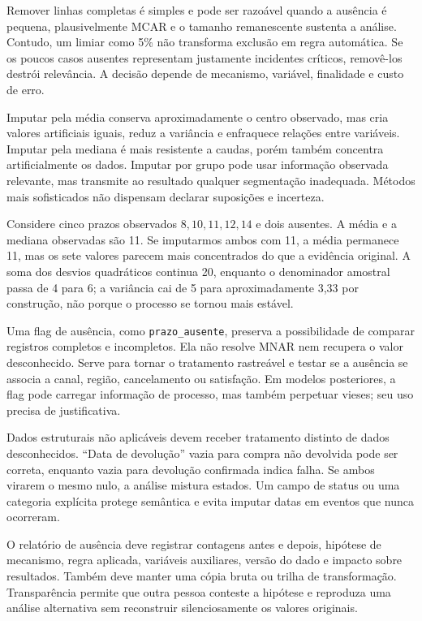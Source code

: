 Remover linhas completas é simples e pode ser razoável quando a ausência é pequena, plausivelmente MCAR e o tamanho remanescente sustenta a análise. Contudo, um limiar como 5\% não transforma exclusão em regra automática. Se os poucos casos ausentes representam justamente incidentes críticos, removê-los destrói relevância. A decisão depende de mecanismo, variável, finalidade e custo de erro.

Imputar pela média conserva aproximadamente o centro observado, mas cria valores artificiais iguais, reduz a variância e enfraquece relações entre variáveis. Imputar pela mediana é mais resistente a caudas, porém também concentra artificialmente os dados. Imputar por grupo pode usar informação observada relevante, mas transmite ao resultado qualquer segmentação inadequada. Métodos mais sofisticados não dispensam declarar suposições e incerteza.

Considere cinco prazos observados $8,10,11,12,14$ e dois ausentes. A média e a mediana observadas são 11. Se imputarmos ambos com 11, a média permanece 11, mas os sete valores parecem mais concentrados do que a evidência original. A soma dos desvios quadráticos continua 20, enquanto o denominador amostral passa de 4 para 6; a variância cai de 5 para aproximadamente 3,33 por construção, não porque o processo se tornou mais estável.

Uma flag de ausência, como \texttt{prazo\_ausente}, preserva a possibilidade de comparar registros completos e incompletos. Ela não resolve MNAR nem recupera o valor desconhecido. Serve para tornar o tratamento rastreável e testar se a ausência se associa a canal, região, cancelamento ou satisfação. Em modelos posteriores, a flag pode carregar informação de processo, mas também perpetuar vieses; seu uso precisa de justificativa.

Dados estruturais não aplicáveis devem receber tratamento distinto de dados desconhecidos. ``Data de devolução'' vazia para compra não devolvida pode ser correta, enquanto vazia para devolução confirmada indica falha. Se ambos virarem o mesmo nulo, a análise mistura estados. Um campo de status ou uma categoria explícita protege semântica e evita imputar datas em eventos que nunca ocorreram.

O relatório de ausência deve registrar contagens antes e depois, hipótese de mecanismo, regra aplicada, variáveis auxiliares, versão do dado e impacto sobre resultados. Também deve manter uma cópia bruta ou trilha de transformação. Transparência permite que outra pessoa conteste a hipótese e reproduza uma análise alternativa sem reconstruir silenciosamente os valores originais.


